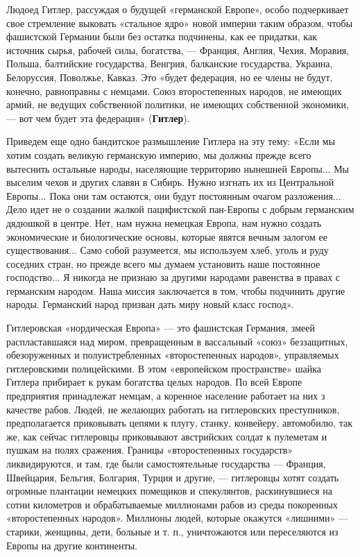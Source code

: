 \documentclass[12pt, a4paper, openany]{book}
\begin{document}
Людоед Гитлер, рассуждая о будущей «германской Европе», особо подчеркивает свое стремление выковать «стальное ядро» новой империи таким образом, чтобы фашистской Германии были без остатка подчинены, как ее придатки, как источник сырья, рабочей силы, богатства, — Франция, Англия, Чехия, Моравия, Польша, балтийские государства, Венгрия, балканские государства, Украина, Белоруссия, Поволжье, Кавказ. Это «будет федерация, но ее члены не будут, конечно, равноправны с немцами. Союз второстепенных народов, не имеющих армий, не ведущих собственной политики, не имеющих собственной экономики, — вот чем будет эта федерация» (\textbf{Гитлер}).

Приведем еще одно бандитское размышление Гитлера на эту тему: «Если мы хотим создать великую германскую империю, мы должны прежде всего вытеснить остальные народы, населяющие территорию нынешней Европы... Мы выселим чехов и других славян в Сибирь. Нужно изгнать их из Центральной Европы... Пока они там остаются, они будут постоянным очагом разложения... Дело идет не о создании жалкой пацифистской пан-Европы с добрым германским дядюшкой в центре. Нет, нам нужна немецкая Европа, нам нужно создать экономические и биологические основы, которые явятся вечным залогом ее существования... Само собой разумеется, мы используем хлеб, уголь и руду соседних стран, но прежде всего мы думаем установить наше постоянное господство... Я никогда не признаю за другими народами равенства в правах с германским народом. Наша миссия заключается в том, чтобы подчинить другие народы. Германский народ призван дать миру новый класс господ».

Гитлеровская «нордическая Европа» — это фашистская Германия, змеей распластавшаяся над миром, превращенным в вассальный «союз» беззащитных, обезоруженных и полуистребленных «второстепенных народов», управляемых гитлеровскими полицейскими. В этом «европейском пространстве» шайка Гитлера прибирает к рукам богатства целых народов. По всей Европе предприятия принадлежат немцам, а коренное население работает на них з качестве рабов. Людей, не желающих работать на гитлеровских преступников, предполагается приковывать цепями к плугу, станку, конвейеру, автомобилю, так же, как сейчас гитлеровцы приковывают австрийских солдат к пулеметам и пушкам на полях сражения. Границы «второстепенных государств» ликвидируются, и там, где были самостоятельные государства — Франция, Швейцария, Бельгия, Болгария, Турция и другие, — гитлеровцы хотят создать огромные плантации немецких помещиков и спекулянтов, раскинувшиеся на сотни километров и обрабатываемые миллионами рабов из среды покоренных «второстепенных народов». Миллионы людей, которые окажутся «лишними» — старики, женщины, дети, больные и т. п., уничтожаются или переселяются из Европы на другие континенты.
\end{document}
